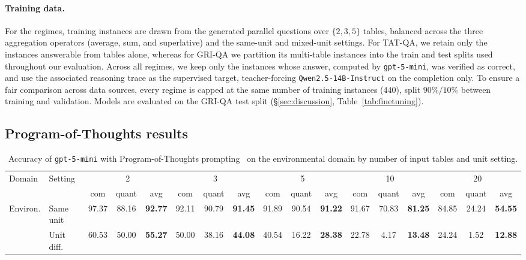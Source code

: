 \paragraph{Training data.} For the \name{} regimes, training instances are
drawn from the generated parallel questions over $\{2,3,5\}$ tables,
balanced across the three aggregation operators (average, sum, and
superlative) and the same-unit and mixed-unit settings. For TAT-QA, we
retain only the instances answerable from tables alone, whereas for GRI-QA
we partition its multi-table instances into the train and test splits used
throughout our evaluation. Across all regimes, we keep only the instances
whose answer, computed by \texttt{gpt-5-mini}, was verified as correct, and
use the associated reasoning trace as the supervised target, teacher-forcing
\texttt{Qwen2.5-14B-Instruct} on the completion only. To ensure a fair
comparison across data sources, every regime is capped at the same number
of training instances ($440$), split $90\%/10\%$ between training and
validation. Models are evaluated on the GRI-QA test split
(\S\ref{sec:discussion}, Table~\ref{tab:finetuning}).

\subsection{Program-of-Thoughts results}

\begin{table}[t]
\centering
\small
\setlength{\tabcolsep}{2.6pt}
\renewcommand{\arraystretch}{1.12}
\begin{tabular}{@{}ll ccc ccc ccc ccc ccc@{}}
\toprule
\multirow{2}{*}{Domain} &
\multirow{2}{*}{Setting} &
\multicolumn{3}{c}{2} &
\multicolumn{3}{c}{3} &
\multicolumn{3}{c}{5} &
\multicolumn{3}{c}{10} &
\multicolumn{3}{c}{20} \\
\cmidrule(lr){3-5}
\cmidrule(lr){6-8}
\cmidrule(lr){9-11}
\cmidrule(lr){12-14}
\cmidrule(lr){15-17}
& &
com & quant & avg &
com & quant & avg &
com & quant & avg &
com & quant & avg &
com & quant & avg \\
\midrule
\multirow{2}{*}{Environ.}
& Same unit
& 97.37 & 88.16 & \textbf{92.77}
& 92.11 & 90.79 & \textbf{91.45}
& 91.89 & 90.54 & \textbf{91.22}
& 91.67 & 70.83 & \textbf{81.25}
& 84.85 & 24.24 & \textbf{54.55} \\
& Unit diff.
& 60.53 & 50.00 & \textbf{55.27}
& 50.00 & 38.16 & \textbf{44.08}
& 40.54 & 16.22 & \textbf{28.38}
& 22.78 & 4.17 & \textbf{13.48}
& 24.24 & 1.52 & \textbf{12.88} \\
\bottomrule
\end{tabular}
\caption{Accuracy of \texttt{gpt-5-mini} with Program-of-Thoughts prompting~\cite{pot} on the environmental domain by number of input tables and unit setting.}
\label{tab:environmental_gpt5mini}
\end{table}

